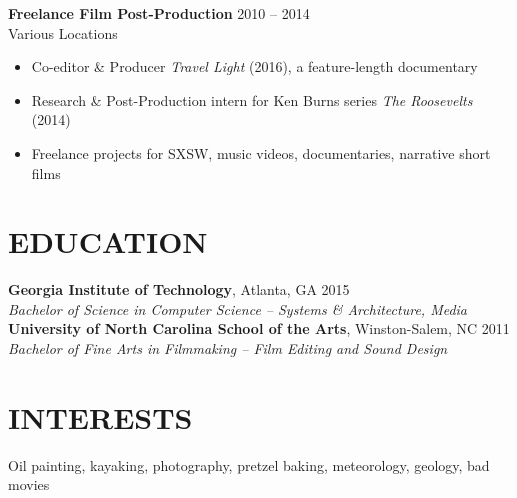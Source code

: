 \documentclass[margin]{res}
\begin{document}
\begin{resume}
                \textbf{Freelance Film Post-Production} \hfill 2010 -- 2014\\
                Various Locations
                \begin{itemize}  \itemsep -2pt %
                  \item Co-editor \& Producer \textit{Travel Light} (2016), a feature-length documentary
                  \item Research \& Post-Production intern for Ken Burns series \textit{The Roosevelts} (2014)
                  \item Freelance projects for SXSW, music videos, documentaries, narrative short films
                \end{itemize}

\section{EDUCATION} \textbf{Georgia Institute of Technology}, Atlanta, GA \hfill 2015\\
                   \textit{Bachelor of Science in Computer Science -- Systems \& Architecture, Media}\vspace{3pt}\\
                   \textbf{University of North Carolina School of the Arts}, Winston-Salem, NC \hfill 2011\\
                   \textit{Bachelor of Fine Arts in Filmmaking -- Film Editing and Sound Design}\\

\vspace{-15pt}

\section{INTERESTS}  Oil painting, kayaking, photography, pretzel baking, meteorology, geology, bad movies\\

\end{resume}
\end{document}
